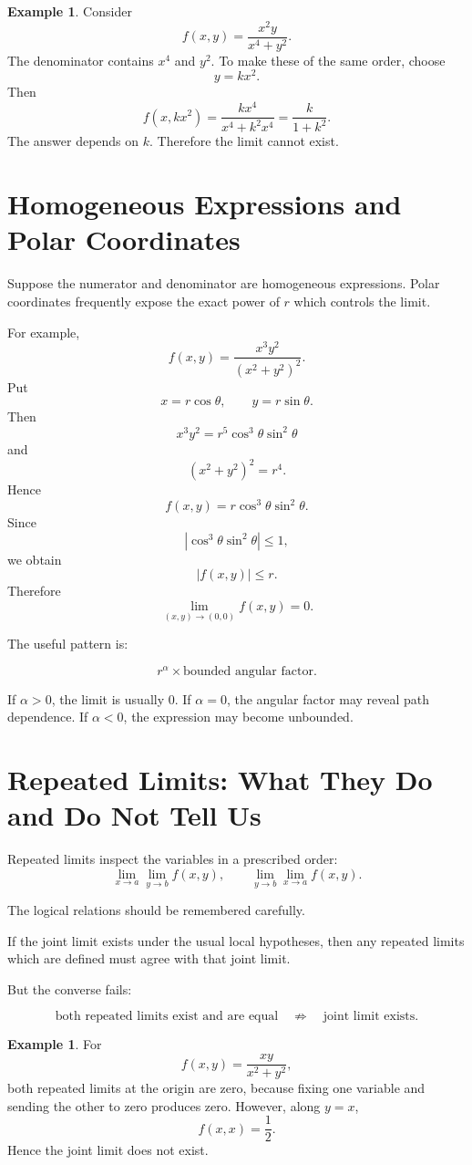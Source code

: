 \documentclass[11pt,oneside]{book}
\theoremstyle{studentthm}
\theoremstyle{definition}
\newtheorem{example}[theorem]{Example}
\begin{document}
\begin{example}
Consider
\[
f(x,y)=\frac{x^2y}{x^4+y^2}.
\]
The denominator contains \(x^4\) and \(y^2\). To make these of the same
order, choose
\[
y=kx^2.
\]
Then
\[
f(x,kx^2)
=
\frac{kx^4}{x^4+k^2x^4}
=
\frac{k}{1+k^2}.
\]
The answer depends on \(k\). Therefore the limit cannot exist.
\end{example}

\section{Homogeneous Expressions and Polar Coordinates}

Suppose the numerator and denominator are homogeneous expressions.
Polar coordinates frequently expose the exact power of \(r\) which
controls the limit.

For example,
\[
f(x,y)
=
\frac{x^3y^2}{(x^2+y^2)^2}.
\]
Put
\[
x=r\cos\theta,\qquad y=r\sin\theta.
\]
Then
\[
x^3y^2
=
r^5\cos^3\theta\sin^2\theta
\]
and
\[
(x^2+y^2)^2=r^4.
\]
Hence
\[
f(x,y)
=
r\cos^3\theta\sin^2\theta.
\]
Since
\[
|\cos^3\theta\sin^2\theta|\le1,
\]
we obtain
\[
|f(x,y)|\le r.
\]
Therefore
\[
\lim_{(x,y)\to(0,0)}f(x,y)=0.
\]

The useful pattern is:

\[
r^\alpha\times\text{bounded angular factor}.
\]

If \(\alpha>0\), the limit is usually \(0\). If \(\alpha=0\), the
angular factor may reveal path dependence. If \(\alpha<0\), the
expression may become unbounded.

\section{Repeated Limits: What They Do and Do Not Tell Us}

Repeated limits inspect the variables in a prescribed order:
\[
\lim_{x\to a}\lim_{y\to b}f(x,y),
\qquad
\lim_{y\to b}\lim_{x\to a}f(x,y).
\]

The logical relations should be remembered carefully.

If the joint limit exists under the usual local hypotheses, then any
repeated limits which are defined must agree with that joint limit.

But the converse fails:

\[
\text{both repeated limits exist and are equal}
\quad\not\Rightarrow\quad
\text{joint limit exists}.
\]

\begin{example}
For
\[
f(x,y)=\frac{xy}{x^2+y^2},
\]
both repeated limits at the origin are zero, because fixing one
variable and sending the other to zero produces zero. However, along
\(y=x\),
\[
f(x,x)=\frac12.
\]
Hence the joint limit does not exist.
\end{example}
\end{document}

